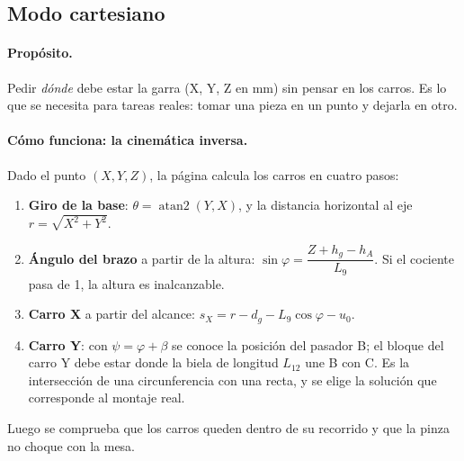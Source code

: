 \documentclass[a4paper,11pt]{article}
\begin{document}
\subsection{Modo cartesiano}

\paragraph{Propósito.} Pedir \emph{dónde} debe estar la garra (X, Y, Z en mm) sin pensar en los carros. Es lo que se necesita para tareas reales: tomar una pieza en un punto y dejarla en otro.

\paragraph{Cómo funciona: la cinemática inversa.}
Dado el punto $(X, Y, Z)$, la página calcula los carros en cuatro pasos:
\begin{enumerate}
\item \textbf{Giro de la base}: $\theta = \operatorname{atan2}(Y, X)$, y la distancia horizontal al eje $r = \sqrt{X^2 + Y^2}$.
\item \textbf{Ángulo del brazo} a partir de la altura: $\sin\varphi = \dfrac{Z + h_g - h_A}{L_9}$. Si el cociente pasa de 1, la altura es inalcanzable.
\item \textbf{Carro X} a partir del alcance: $s_X = r - d_g - L_9\cos\varphi - u_0$.
\item \textbf{Carro Y}: con $\psi = \varphi + \beta$ se conoce la posición del pasador B; el bloque del carro Y debe estar donde la biela de longitud $L_{12}$ une B con C. Es la intersección de una circunferencia con una recta, y se elige la solución que corresponde al montaje real.
\end{enumerate}
Luego se comprueba que los carros queden dentro de su recorrido y que la pinza no choque con la mesa.
\end{document}
